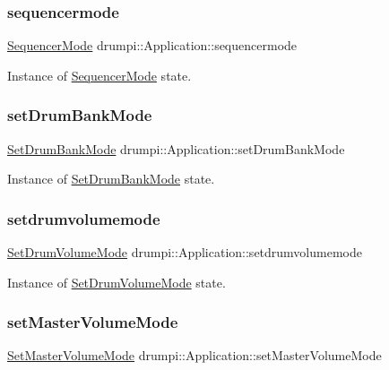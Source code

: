 \subsubsection{\texorpdfstring{sequencermode}{sequencermode}}
{\footnotesize\ttfamily \hyperlink{classdrumpi_1_1SequencerMode}{Sequencer\+Mode} drumpi\+::\+Application\+::sequencermode}

Instance of \hyperlink{classdrumpi_1_1SequencerMode}{Sequencer\+Mode} state. \mbox{\label{classdrumpi_1_1Application_a92e4162f1a85a267ff7de85ebeb31f8a}} 
\subsubsection{\texorpdfstring{set\+Drum\+Bank\+Mode}{setDrumBankMode}}
{\footnotesize\ttfamily \hyperlink{classdrumpi_1_1SetDrumBankMode}{Set\+Drum\+Bank\+Mode} drumpi\+::\+Application\+::set\+Drum\+Bank\+Mode}

Instance of \hyperlink{classdrumpi_1_1SetDrumBankMode}{Set\+Drum\+Bank\+Mode} state. \mbox{\label{classdrumpi_1_1Application_a6993ce12d76456caba93f453da580892}} 
\subsubsection{\texorpdfstring{setdrumvolumemode}{setdrumvolumemode}}
{\footnotesize\ttfamily \hyperlink{classdrumpi_1_1SetDrumVolumeMode}{Set\+Drum\+Volume\+Mode} drumpi\+::\+Application\+::setdrumvolumemode}

Instance of \hyperlink{classdrumpi_1_1SetDrumVolumeMode}{Set\+Drum\+Volume\+Mode} state. \mbox{\label{classdrumpi_1_1Application_a9a6dfaebc7929553d6b1b5ed9407be11}} 
\subsubsection{\texorpdfstring{set\+Master\+Volume\+Mode}{setMasterVolumeMode}}
{\footnotesize\ttfamily \hyperlink{classdrumpi_1_1SetMasterVolumeMode}{Set\+Master\+Volume\+Mode} drumpi\+::\+Application\+::set\+Master\+Volume\+Mode}

